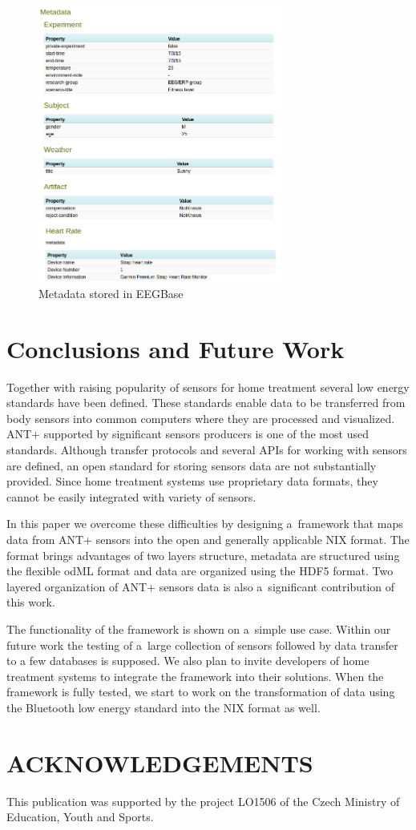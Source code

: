 \documentclass[a4paper,twoside]{article}
\begin{document}
\begin{figure}
  \centering\includegraphics[width=8cm]{portal_example.png}
  \caption{Metadata stored in EEGBase}
  \label{fig:EEGBase}
 \end{figure}


\section{Conclusions and Future Work}\label{sec:future-work}

Together with raising popularity of sensors for home treatment several low energy standards have been defined. These standards enable data to be transferred from body sensors into common computers where they are processed and visualized. ANT+ supported by significant sensors producers is one of the most used standards. Although transfer protocols and several APIs for working with sensors are defined, an open standard for storing sensors data are not substantially provided. Since home treatment systems use proprietary data formats, they cannot be easily integrated with variety of sensors.

In this paper we overcome these difficulties by designing a~framework that maps data from ANT+ sensors into the open and generally applicable NIX format. The format brings advantages of two layers structure, metadata are structured using the flexible odML format and data are organized using the HDF5 format. Two layered organization of ANT+ sensors data is also a~significant contribution of this work.

The functionality of the framework is shown on a~simple use case. Within our future work the testing of a~large collection of sensors followed by data transfer to a few databases is supposed. We also plan to invite developers of home treatment systems to integrate the framework into their solutions. When the framework is fully tested, we start to work on the transformation of data using the Bluetooth low energy standard into the NIX format as well.


\section*{\uppercase{Acknowledgements}}

\noindent This publication was supported by the project LO1506 of the Czech Ministry of Education, Youth and Sports.


{\small
}

\vfill
\end{document}
